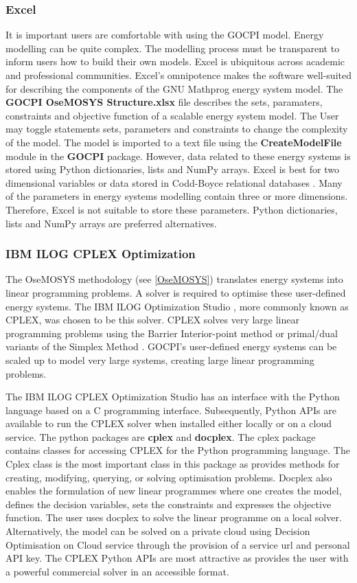 \documentclass[12pt]{article}
\begin{document}
\subsubsection{Excel}
It is important users are comfortable with using the GOCPI model. 
Energy modelling can be quite complex. The modelling process must be transparent to inform users how to build their own models.
Excel is ubiquitous across academic and professional communities.
Excel's omnipotence makes the software well-suited for describing the components of the GNU Mathprog energy system model.
The \textbf{GOCPI OseMOSYS Structure.xlsx} file describes the sets, paramaters, constraints and objective function of a scalable energy system model.
The User may toggle statements sets, parameters and constraints to change the complexity of the model. 
The model is imported to a text file using the \textbf{CreateModelFile} module in the \textbf{GOCPI} package.
However, data related to these energy systems is stored using Python dictionaries, lists and NumPy arrays.
Excel is best for two dimensional variables or data stored in Codd-Boyce relational databases \cite{CBNF}.
Many of the parameters in energy systems modelling contain three or more dimensions. 
Therefore, Excel is not suitable to store these parameters.
Python dictionaries, lists and NumPy arrays are preferred alternatives.

\subsubsection{IBM ILOG CPLEX Optimization}
The OseMOSYS methodology (see \ref{OseMOSYS}) translates energy systems into linear programming problems. A solver is required to optimise these user-defined energy systems.
The IBM ILOG Optimization Studio \cite{IBM_ILOG}, more commonly known as CPLEX, was chosen to be this solver.
CPLEX solves very large linear programming problems using the Barrier Interior-point method \cite{IPM} or primal/dual variants of the Simplex Method \cite{Simplex}.
GOCPI's user-defined energy systems can be scaled up to model very large systems, creating large linear programming problems.

The IBM ILOG CPLEX Optimization Studio has an interface with the Python language based on a C programming interface.
Subsequently, Python APIs are available to run the CPLEX solver when installed either locally or on a cloud service.
The python packages are \textbf{cplex} and \textbf{docplex}. The cplex package contains classes for accessing CPLEX for the Python programming language. 
The Cplex class is the most important class in this package as provides methods for creating, modifying, querying, or solving optimisation problems.
Docplex also enables the formulation of new linear programmes where one creates the model, defines the decision variables, sets the constraints and expresses the objective function.
The user uses docplex to solve the linear programme on a local solver. 
Alternatively, the model can be solved on a private cloud using Decision Optimisation on Cloud service through the provision of a service url and personal API key.
The CPLEX Python APIs are most attractive as provides the user with a powerful commercial solver in an accessible format.
\end{document}
